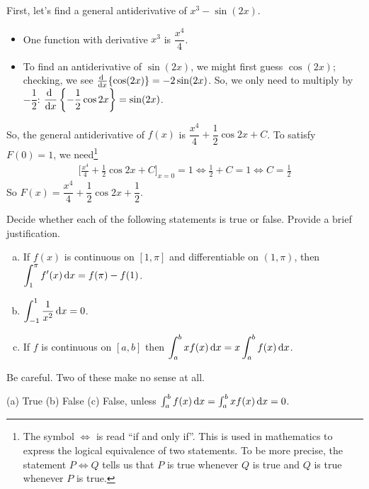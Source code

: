 \begin{solution}
First, let's find a general antiderivative of $x^3-\sin(2x)$.
\begin{itemize}
\item One function with derivative $x^3$ is $\dfrac{x^4}{4}$.
\item  To find an antiderivative of $\sin(2x)$, we might first guess $\cos(2x)$; checking, we see $\diff{}{x}\{\cos(2x)\}=-2\sin(2x)$. So, we only need to multiply by $-\dfrac{1}{2}$: $\displaystyle\diff{}{x}\left\{-\dfrac{1}{2}\cos 2x\right\}=\sin(2x)$.
\end{itemize}
So, the general antiderivative
of $f(x)$ is $\dfrac{x^4}{4}+\dfrac{1}{2}\cos 2x+C$. To satisfy $F(0)=1$,
we need\footnote{The symbol
$\iff$ is read ``if and only if''. This is used in mathematics to
express the logical equivalence of two statements. To be more precise,
the statement $P \iff Q$ tells us that $P$ is true whenever $Q$ is true
and $Q$ is true whenever $P$ is true.}
\begin{align*}
\Big[\frac{x^4}{4}+\frac{1}{2}\cos 2x+C\Big]_{x=0}=1
\iff \frac{1}{2} + C = 1
\iff C=\frac{1}{2}
\end{align*}
So $F(x) = \dfrac{x^4}{4}+\dfrac{1}{2}\cos 2x+\dfrac{1}{2}$.
\end{solution}

\begin{Mquestion}[2014D]
Decide whether each of the following statements is true or false.
Provide a brief justification.

\begin{enumerate}[(a)]
\item
If $f(x)$ is continuous on $[1, \pi]$ and differentiable on $(1,\pi)$, then
           $\displaystyle\int_1^\pi f'(x)\,\mathrm{d}x = f(\pi)-f(1)$.
\item
 $\displaystyle\int_{-1}^1 \frac{1}{x^2}\,\mathrm{d}x = 0$.

\item
If $f$ is continuous on $[a, b]$ then
           $\displaystyle\int_a^b xf(x)\,\mathrm{d}x = x\int_a^b f(x)\,\mathrm{d}x $.

\end{enumerate}
\end{Mquestion}

\begin{hint}
Be careful. Two of these make no sense at all.
\end{hint}

\begin{answer}
(a) True
\qquad (b) False
\qquad (c) False, unless $\int_a^b f(x)\,\mathrm{d}x=\int_a^b xf(x)\,\mathrm{d}x = 0$.
\end{answer}

